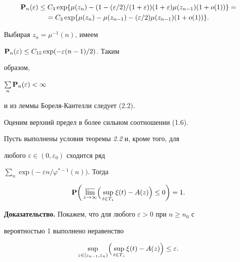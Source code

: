 \begin{pf}
\begin{gather*}
{\bold P}_n(\varepsilon)\le C_3\exp\{\mu(z_n)-(1-(\varepsilon/2) 


/(1+\varepsilon))(1+\varepsilon)\mu(z_{n-1})(1+o(1))\}=\\ 


=C_3\exp\{\mu(z_n)-\mu(z_{n-1})-(\varepsilon/2)\mu(z_{n-1}) 


(1+o(1))\}. 


\end{gather*} 


Выбирая $z_n=\mu^{-1}(n)$, имеем 


${\bold P}_n(\varepsilon)\le C_{15}\exp(-\varepsilon(n-1)/2)$. Таким 


образом, 


$\sum\limits_n{\bold P}_n(\varepsilon)<\infty$ 


и из леммы Бореля-Кантелли следует (2.2). 


\end{pf} 


 


Оценим верхний предел в более сильном соотношении (1.6). 


 


\begin{thms} Пусть выполнены условия теоремы {\em 2.2} и, кроме того, для 


любого $\varepsilon\in(0,\varepsilon_0)$ сходится ряд 


$\sum\limits_n\exp\bigl(-\varepsilon n/\varphi^{*-1}(n)\bigr)$. Тогда 


$$ 


{\bold P}\biggl(\,\underset{z\to\infty}{\varlimsup}\Bigl(\, 


\sup_{t\in T_z}\xi(t)-A(z)\Bigr)\le 0\biggr)=1. 


$$ 


\end{thms} 


 


{\bf Доказательство.} Покажем, что для любого $\varepsilon>0$ при $n\ge n_0$ с 


вероятностью 1 выполнено неравенство 


\begin{equation} 


\sup_{z\in[z_{n-1},z_n)}\Bigl(\, 


\sup_{t\in T_z}\xi(t)-A(z)\Bigr)\le \varepsilon. 


\end{equation} 


